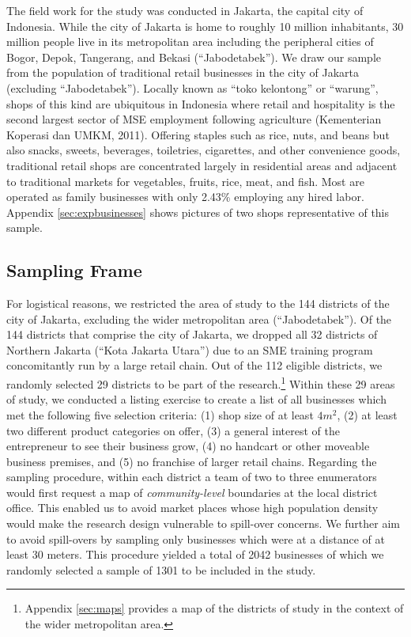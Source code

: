 \documentclass[11.5pt]{article}
\begin{document}
The field work for the study was conducted in Jakarta, the capital city of Indonesia. While the city of Jakarta is home to roughly 10 million inhabitants, 30 million people live in its metropolitan area including the peripheral cities of Bogor, Depok, Tangerang, and Bekasi (``Jabodetabek''). We draw our sample from the population of traditional retail businesses in the city of Jakarta (excluding ``Jabodetabek''). Locally known as ``toko kelontong'' or ``warung'', shops of this kind are ubiquitous in Indonesia where retail and hospitality is the second largest sector of MSE employment following agriculture (Kementerian Koperasi dan UMKM, 2011). Offering staples such as rice, nuts, and beans but also snacks, sweets, beverages, toiletries, cigarettes, and other convenience goods, traditional retail shops are concentrated largely in residential areas and adjacent to traditional markets for vegetables, fruits, rice, meat, and fish. Most are operated as family businesses with only 2.43\% employing any hired labor. Appendix \ref{sec:expbusinesses} shows pictures of two shops representative of this sample.


\subsection{Sampling Frame}

For logistical reasons, we restricted the area of study to the 144 districts of the city of Jakarta, excluding the wider metropolitan area (``Jabodetabek''). Of the 144 districts that comprise the city of Jakarta, we dropped all 32 districts of Northern Jakarta (``Kota Jakarta Utara'') due to an SME training program concomitantly run by a large retail chain. Out of the 112 eligible districts, we randomly selected 29 districts to be part of the research.\footnote{Appendix \ref{sec:maps} provides a map of the districts of study in the context of the wider metropolitan area.} Within these 29 areas of study, we conducted a listing exercise to create a list of all businesses which met the following five selection criteria: (1) shop size of at least $4m^2$, (2) at least two different product categories on offer, (3) a general interest of the entrepreneur to see their business grow, (4) no handcart or other moveable business premises, and (5) no franchise of larger retail chains. Regarding the sampling procedure, within each district a team of two to three enumerators would first request a map of \textit{community-level} boundaries at the local district office. This enabled us to avoid market places whose high population density would make the research design vulnerable to spill-over concerns. We further aim to avoid spill-overs by sampling only businesses which were at a distance of at least 30 meters. This procedure yielded a total of 2042 businesses of which we randomly selected a sample of 1301 to be included in the study.
\end{document}
